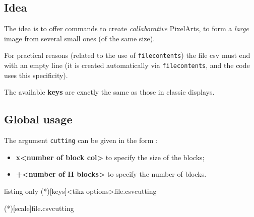\documentclass{article}
\newcommand\Cle[1]{{\bfseries\sffamily\textlangle #1\textrangle}}
\begin{document}
\subsection{Idea}

The idea is to offer commands to create \textit{collaborative} PixelArts, to form a \textit{large} image from several small ones (of the same size).

\smallskip

{\footnotesize\faBomb} For practical reasons (related to the use of \texttt{filecontents}) the file \textsf{csv} must end with an empty line (it is created automatically via \texttt{filecontents}, and the code uses this specificity).

\smallskip

The available \Cle{keys} are exactly the same as those in classic displays.

\subsection{Global usage}

The argument \texttt{cutting} can be given in the form :
%
\begin{itemize}
	\item \Cle{<number of block length>x<number of block col>} to specify the size of the blocks;
	\item \Cle{<number of V blocks>+<number of H blocks>} to specify the number of blocks.
\end{itemize}

\begin{PresentationCode}{listing only}
\CutPixlArtTikz(*)[keys]<tikz options>{file.csv}{cutting}

\HelpGridPixelArtTikz(*)[scale]{file.csv}{cutting}
\end{PresentationCode}
\end{document}
